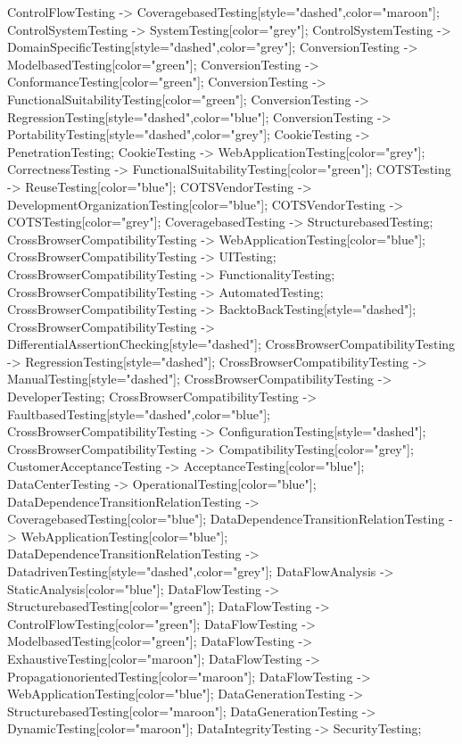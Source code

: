 \documentclass{article}
\begin{document}
{ControlFlowTesting -> CoveragebasedTesting[style="dashed",color="maroon"];
ControlSystemTesting -> SystemTesting[color="grey"];
ControlSystemTesting -> DomainSpecificTesting[style="dashed",color="grey"];
ConversionTesting -> ModelbasedTesting[color="green"];
ConversionTesting -> ConformanceTesting[color="green"];
ConversionTesting -> FunctionalSuitabilityTesting[color="green"];
ConversionTesting -> RegressionTesting[style="dashed",color="blue"];
ConversionTesting -> PortabilityTesting[style="dashed",color="grey"];
CookieTesting -> PenetrationTesting;
CookieTesting -> WebApplicationTesting[color="grey"];
CorrectnessTesting -> FunctionalSuitabilityTesting[color="green"];
COTSTesting -> ReuseTesting[color="blue"];
COTSVendorTesting -> DevelopmentOrganizationTesting[color="blue"];
COTSVendorTesting -> COTSTesting[color="grey"];
CoveragebasedTesting -> StructurebasedTesting;
CrossBrowserCompatibilityTesting -> WebApplicationTesting[color="blue"];
CrossBrowserCompatibilityTesting -> UITesting;
CrossBrowserCompatibilityTesting -> FunctionalityTesting;
CrossBrowserCompatibilityTesting -> AutomatedTesting;
CrossBrowserCompatibilityTesting -> BacktoBackTesting[style="dashed"];
CrossBrowserCompatibilityTesting -> DifferentialAssertionChecking[style="dashed"];
CrossBrowserCompatibilityTesting -> RegressionTesting[style="dashed"];
CrossBrowserCompatibilityTesting -> ManualTesting[style="dashed"];
CrossBrowserCompatibilityTesting -> DeveloperTesting;
CrossBrowserCompatibilityTesting -> FaultbasedTesting[style="dashed",color="blue"];
CrossBrowserCompatibilityTesting -> ConfigurationTesting[style="dashed"];
CrossBrowserCompatibilityTesting -> CompatibilityTesting[color="grey"];
CustomerAcceptanceTesting -> AcceptanceTesting[color="blue"];
DataCenterTesting -> OperationalTesting[color="blue"];
DataDependenceTransitionRelationTesting -> CoveragebasedTesting[color="blue"];
DataDependenceTransitionRelationTesting -> WebApplicationTesting[color="blue"];
DataDependenceTransitionRelationTesting -> DatadrivenTesting[style="dashed",color="grey"];
DataFlowAnalysis -> StaticAnalysis[color="blue"];
DataFlowTesting -> StructurebasedTesting[color="green"];
DataFlowTesting -> ControlFlowTesting[color="green"];
DataFlowTesting -> ModelbasedTesting[color="green"];
DataFlowTesting -> ExhaustiveTesting[color="maroon"];
DataFlowTesting -> PropagationorientedTesting[color="maroon"];
DataFlowTesting -> WebApplicationTesting[color="blue"];
DataGenerationTesting -> StructurebasedTesting[color="maroon"];
DataGenerationTesting -> DynamicTesting[color="maroon"];
DataIntegrityTesting -> SecurityTesting;
}
\end{document}
